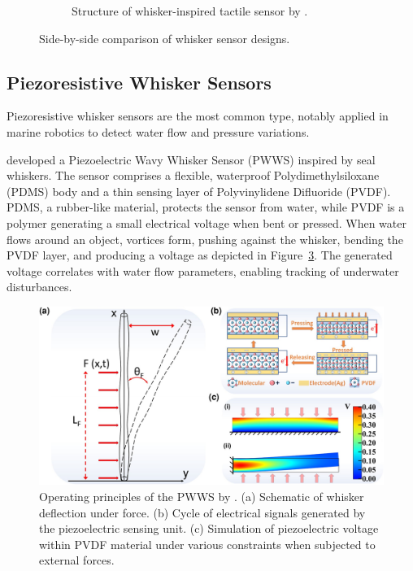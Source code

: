 \begin{figure}[htb]
\begin{subfigure}{0.48\textwidth}
        \caption{Structure of whisker-inspired tactile sensor by \textcite{dang2025whisker}.}
        \label{fig:dang-whisker}
    \end{subfigure}
    \caption{Side-by-side comparison of whisker sensor designs.}
\end{figure}

\subsection{Piezoresistive Whisker Sensors}
Piezoresistive whisker sensors are the most common type, notably applied in marine robotics to detect water flow and pressure variations.

\textcite{GUO2024114875} developed a Piezoelectric Wavy Whisker Sensor (PWWS) inspired by seal whiskers.
The sensor comprises a flexible, waterproof Polydimethylsiloxane (PDMS) body and a thin sensing layer of Polyvinylidene Difluoride (PVDF).
PDMS, a rubber-like material, protects the sensor from water, while PVDF is a polymer generating a small electrical voltage when bent or pressed.
When water flows around an object, vortices form, pushing against the whisker, bending the PVDF layer, and producing a voltage as depicted in Figure~\ref{fig:piezoelectric-whisker}.
The generated voltage correlates with water flow parameters, enabling tracking of underwater disturbances.

\begin{figure}[htb]
    \centering
    \includegraphics[width=\textwidth]{figures/piezoelectric-whisker}
    \caption{Operating principles of the PWWS by \textcite{GUO2024114875}. (a) Schematic of whisker deflection under force. (b) Cycle of electrical signals generated by the piezoelectric sensing unit. (c) Simulation of piezoelectric voltage within PVDF material under various constraints when subjected to external forces.}
    \label{fig:piezoelectric-whisker}
\end{figure}

